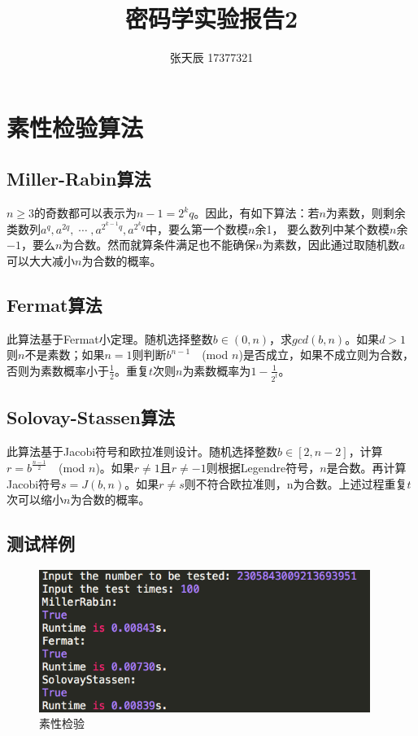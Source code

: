 \documentclass[11pt]{ctexart}
\title{密码学实验报告2}
\author{张天辰	17377321}
\begin{document}
\maketitle{}



\section{素性检验算法}
\subsection{Miller-Rabin算法}
$n \geqslant 3$的奇数都可以表示为$n - 1 = 2 ^ k q$。因此，有如下算法：若$n$为素数，则剩余类数列$a^q, a^{2q},\; \cdots \;, a^{2^{k - 1}q}, a^{2^kq}$中，要么第一个数模$n$余1， 要么数列中某个数模$n$余$-1$，要么$n$为合数。然而就算条件满足也不能确保$n$为素数，因此通过取随机数$a$可以大大减小$n$为合数的概率。

\subsection{Fermat算法}
此算法基于Fermat小定理。随机选择整数$b \in (0, n)$，求$gcd(b, n)$。如果$d > 1$则$n$不是素数；如果$n = 1$则判断$b^{n - 1}\quad$(mod $n$)是否成立，如果不成立则为合数，否则为素数概率小于$\frac{1}{2}$。重复$t$次则$n$为素数概率为$1 - \frac{1}{2^t}$。

\subsection{Solovay-Stassen算法}
此算法基于Jacobi符号和欧拉准则设计。随机选择整数$b \in [2, n - 2]$，计算$r = b^{\frac{n - 1}{2}}\quad$(mod $n$)。如果$r \neq 1$且$r \neq -1$则根据Legendre符号，$n$是合数。再计算Jacobi符号$s = J(b, n)$。如果$r \neq s$则不符合欧拉准则，n为合数。上述过程重复$t$次可以缩小$n$为合数的概率。

\subsection{测试样例}
\begin{figure}[htbp]
\centering
\includegraphics[height=4.62cm,width=10.76cm]{prime.png}
\caption{素性检验}
\label{img_prime}
\end{figure}
\end{document}
